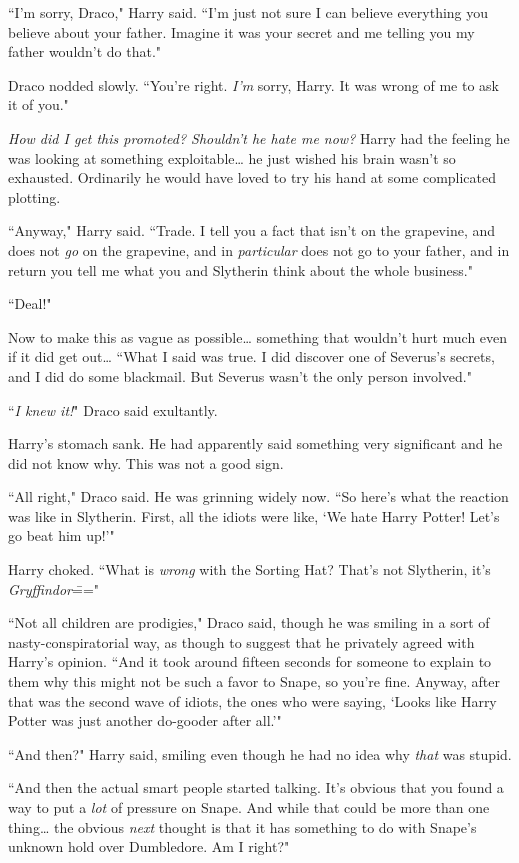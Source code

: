 ``I'm sorry, Draco," Harry said. ``I'm just not sure I can believe everything you believe about your father. Imagine it was your secret and me telling you my father wouldn't do that."

Draco nodded slowly. ``You're right. \emph{I'm} sorry, Harry. It was wrong of me to ask it of you."

\emph{How did I get \emph{this} promoted? Shouldn't he hate me now?} Harry had the feeling he was looking at something exploitable{\ldots} he just wished his brain wasn't so exhausted. Ordinarily he would have loved to try his hand at some complicated plotting.

``Anyway," Harry said. ``Trade. I tell you a fact that isn't on the grapevine, and does not \emph{go} on the grapevine, and in \emph{particular} does not go to your father, and in return you tell me what you and Slytherin think about the whole business."

``Deal!"

Now to make this as vague as possible{\ldots} something that wouldn't hurt much even if it did get out{\ldots} ``What I said was true. I did discover one of Severus's secrets, and I did do some blackmail. But Severus wasn't the only person involved."

``\emph{I knew it!}" Draco said exultantly.

Harry's stomach sank. He had apparently said something very significant and he did not know why. This was not a good sign.

``All right," Draco said. He was grinning widely now. ``So here's what the reaction was like in Slytherin. First, all the idiots were like, `We hate Harry Potter! Let's go beat him up!'"

Harry choked. ``What is \emph{wrong} with the Sorting Hat? That's not Slytherin, it's \emph{Gryffindor}\==="

``Not all children are prodigies," Draco said, though he was smiling in a sort of nasty-conspiratorial way, as though to suggest that he privately agreed with Harry's opinion. ``And it took around fifteen seconds for someone to explain to them why this might not be such a favor to Snape, so you're fine. Anyway, after that was the second wave of idiots, the ones who were saying, `Looks like Harry Potter was just another do-gooder after all.'"

``And then?" Harry said, smiling even though he had no idea why \emph{that} was stupid.

``And then the actual smart people started talking. It's obvious that you found a way to put a \emph{lot} of pressure on Snape. And while that could be more than one thing{\ldots} the obvious \emph{next} thought is that it has something to do with Snape's unknown hold over Dumbledore. Am I right?"

